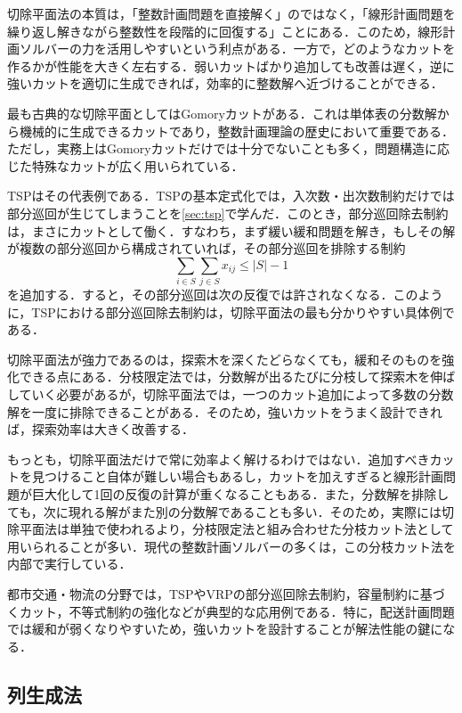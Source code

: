 切除平面法の本質は，「整数計画問題を直接解く」のではなく，「線形計画問題を繰り返し解きながら整数性を段階的に回復する」ことにある．このため，線形計画ソルバーの力を活用しやすいという利点がある．一方で，どのようなカットを作るかが性能を大きく左右する．弱いカットばかり追加しても改善は遅く，逆に強いカットを適切に生成できれば，効率的に整数解へ近づけることができる．

最も古典的な切除平面としてはGomoryカットがある．これは単体表の分数解から機械的に生成できるカットであり，整数計画理論の歴史において重要である．ただし，実務上はGomoryカットだけでは十分でないことも多く，問題構造に応じた特殊なカットが広く用いられている．

TSPはその代表例である．TSPの基本定式化では，入次数・出次数制約だけでは部分巡回が生じてしまうことを\ref{sec:tsp}で学んだ．このとき，部分巡回除去制約は，まさにカットとして働く．すなわち，まず緩い緩和問題を解き，もしその解が複数の部分巡回から構成されていれば，その部分巡回を排除する制約
\begin{equation}
\sum_{i\in S}\sum_{j\in S}x_{ij}\le |S|-1
\end{equation}
を追加する．すると，その部分巡回は次の反復では許されなくなる．このように，TSPにおける部分巡回除去制約は，切除平面法の最も分かりやすい具体例である．

切除平面法が強力であるのは，探索木を深くたどらなくても，緩和そのものを強化できる点にある．分枝限定法では，分数解が出るたびに分枝して探索木を伸ばしていく必要があるが，切除平面法では，一つのカット追加によって多数の分数解を一度に排除できることがある．そのため，強いカットをうまく設計できれば，探索効率は大きく改善する．

もっとも，切除平面法だけで常に効率よく解けるわけではない．追加すべきカットを見つけること自体が難しい場合もあるし，カットを加えすぎると線形計画問題が巨大化して1回の反復の計算が重くなることもある．また，分数解を排除しても，次に現れる解がまた別の分数解であることも多い．そのため，実際には切除平面法は単独で使われるより，分枝限定法と組み合わせた分枝カット法として用いられることが多い．現代の整数計画ソルバーの多くは，この分枝カット法を内部で実行している．

都市交通・物流の分野では，TSPやVRPの部分巡回除去制約，容量制約に基づくカット，不等式制約の強化などが典型的な応用例である．特に，配送計画問題では緩和が弱くなりやすいため，強いカットを設計することが解法性能の鍵になる．


\subsection{列生成法}

